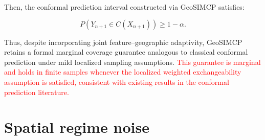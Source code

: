 \documentclass[authoryear,preprint,review,12pt]{elsarticle}
\begin{document}
Then, the conformal prediction interval constructed via GeoSIMCP satisfies:

\begin{equation}
P\left( Y_{n+1} \in C(X_{n+1}) \right) \geq 1 - \alpha.
\end{equation}

Thus, despite incorporating joint feature--geographic adaptivity, GeoSIMCP retains a formal marginal coverage guarantee analogous to classical conformal prediction under mild localized sampling assumptions. 
\textcolor{red}{This guarantee is marginal and holds in finite samples whenever the localized weighted exchangeability assumption is satisfied, consistent with existing results in the conformal prediction literature.}


\section{Spatial regime noise}
\end{document}
